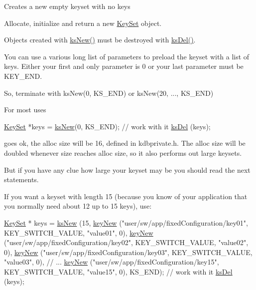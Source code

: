Creates a new empty keyset with no keys

Allocate, initialize and return a new \hyperlink{classkdb_1_1KeySet}{Key\-Set} object.

Objects created with \hyperlink{group__keyset_ga671e1aaee3ae9dc13b4834a4ddbd2c3c}{ks\-New()} must be destroyed with \hyperlink{group__keyset_ga27e5c16473b02a422238c8d970db7ac8}{ks\-Del()}.

You can use a various long list of parameters to preload the keyset with a list of keys. Either your first and only parameter is 0 or your last parameter must be K\-E\-Y\-\_\-\-E\-N\-D.

So, terminate with ks\-New(0, K\-S\-\_\-\-E\-N\-D) or ks\-New(20, ..., K\-S\-\_\-\-E\-N\-D)

For most uses 
\begin{DoxyCode}
\hyperlink{classkdb_1_1KeySet_a4eac9850fa4f06c07a5306befc3e4377}{KeySet} *keys = \hyperlink{group__keyset_ga671e1aaee3ae9dc13b4834a4ddbd2c3c}{ksNew}(0, KS\_END);
\textcolor{comment}{// work with it}
\hyperlink{group__keyset_ga27e5c16473b02a422238c8d970db7ac8}{ksDel} (keys);
\end{DoxyCode}
 goes ok, the alloc size will be 16, defined in kdbprivate.\-h. The alloc size will be doubled whenever size reaches alloc size, so it also performs out large keysets.

But if you have any clue how large your keyset may be you should read the next statements.

If you want a keyset with length 15 (because you know of your application that you normally need about 12 up to 15 keys), use\-: 
\begin{DoxyCode}
\hyperlink{classkdb_1_1KeySet_a4eac9850fa4f06c07a5306befc3e4377}{KeySet} * keys = \hyperlink{group__keyset_ga671e1aaee3ae9dc13b4834a4ddbd2c3c}{ksNew} (15,
        \hyperlink{group__key_gad23c65b44bf48d773759e1f9a4d43b89}{keyNew} (\textcolor{stringliteral}{"user/sw/app/fixedConfiguration/key01"}, KEY\_SWITCH\_VALUE,
       \textcolor{stringliteral}{"value01"}, 0),
        \hyperlink{group__key_gad23c65b44bf48d773759e1f9a4d43b89}{keyNew} (\textcolor{stringliteral}{"user/sw/app/fixedConfiguration/key02"}, KEY\_SWITCH\_VALUE,
       \textcolor{stringliteral}{"value02"}, 0),
        \hyperlink{group__key_gad23c65b44bf48d773759e1f9a4d43b89}{keyNew} (\textcolor{stringliteral}{"user/sw/app/fixedConfiguration/key03"}, KEY\_SWITCH\_VALUE,
       \textcolor{stringliteral}{"value03"}, 0),
        \textcolor{comment}{// ...}
        \hyperlink{group__key_gad23c65b44bf48d773759e1f9a4d43b89}{keyNew} (\textcolor{stringliteral}{"user/sw/app/fixedConfiguration/key15"}, KEY\_SWITCH\_VALUE,
       \textcolor{stringliteral}{"value15"}, 0),
        KS\_END);
\textcolor{comment}{// work with it}
\hyperlink{group__keyset_ga27e5c16473b02a422238c8d970db7ac8}{ksDel} (keys);
\end{DoxyCode}


